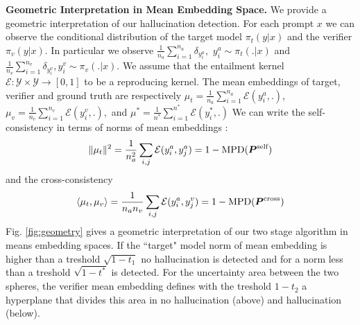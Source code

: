 \textbf{Geometric Interpretation in Mean Embedding Space.} We provide a geometric interpretation of our hallucination detection. 
For each prompt $x$ we can observe the conditional distribution of the target model  $\pi_t(y|x)$ and the verifier $\pi_v(y|x)$. In particular we observe $ \frac{1}{n_a} \sum_{i=1}^{n_a} \delta_{y^a_i},$ $y^a_i\sim \pi_t(.|x)$ and $ \frac{1}{n_v} \sum_{i=1}^{n_v} \delta_{y^v_i},y^v_i\sim \pi_v(.|x)$. We assume that the entailment kernel $\mathcal{E}: \mathcal{Y} \times\mathcal{Y} \to [0,1]$ to be a reproducing kernel. The mean embeddings \cite{Muandet_2017} of target, verifier and ground truth are respectively
$ \mu_t = \frac{1}{n_a} \sum_{i=1}^{n_a} \mathcal{E} (y^a_i,.)$,
$\mu_v = \frac{1}{n_v} \sum_{i=1}^{n_v} \mathcal{E} (y^v_i,.),$ and $\mu^* = \frac{1}{n^*} \sum_{i=1}^{n^*}\mathcal{E}(y^*_i, .)$ We can write the self-consistency in terms of norms of mean embeddings : 
\[\| \mu_t\|^2 = \frac{1}{n_a^2}\sum_{i,j} \mathcal{E}(y^a_i, y^a_j) =  1 - \text{MPD}({\bm{P}}^{\text{self}})\]
and the cross-consistency
\[\langle 
\mu_t,\mu_v\rangle = \frac{1}{n_an_v}\sum_{i,j} \mathcal{E}(y^a_i, y^v_j) = 1-\text{MPD}({\bm{P}}^{\text{cross}})\]
Fig. \ref{fig:geometry} gives a geometric interpretation of our two stage algorithm in means embedding spaces. If the ``target" model norm of mean embedding is higher than a treshold $\sqrt{1-t_1}$  no hallucination is detected   and for a norm less than a treshold $\sqrt{1-t^*}$ is detected. For the uncertainty area between the two spheres, the verifier mean embedding defines with the treshold $1-t_2$ a hyperplane that divides this area in no hallucination (above) and hallucination (below).  






